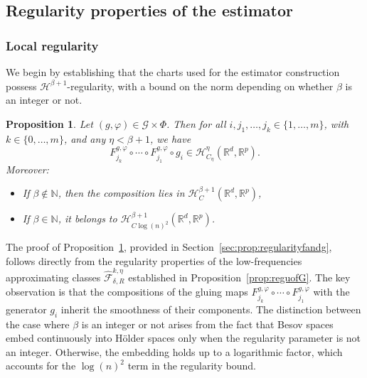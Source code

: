\documentclass[10pt]{article}
\newtheorem{proposition}{Proposition}
\begin{document}
\subsection{Regularity properties of the estimator}\label{sec:reguofes}
\subsubsection{Local regularity}
We begin by establishing that the charts used for the estimator construction possess \( \mathcal{H}^{\beta+1} \)-regularity, with a  bound on the norm depending on whether \( \beta \) is an integer or not.

\begin{proposition}\label{prop:regularityfandg}
Let \( (g, \varphi) \in \mathcal{G} \times \Phi \). Then for all \( i, j_1, \ldots, j_k \in \{1, \ldots, m\} \), with \( k \in \{0, \ldots, m\} \), and any \( \eta < \beta+1 \), we have
\[
F^{g,\varphi}_{j_k} \circ \cdots \circ F^{g,\varphi}_{j_1} \circ g_i \in \mathcal{H}^{\eta}_{C_\eta}(\mathbb{R}^d, \mathbb{R}^p).
\]
Moreover:
\begin{itemize}
    \item If \( \beta \notin \mathbb{N} \), then the composition lies in \( \mathcal{H}^{\beta+1}_C(\mathbb{R}^d, \mathbb{R}^p) \),
    \item If \( \beta \in \mathbb{N} \), it belongs to \( \mathcal{H}^{\beta+1}_{C\log(n)^2}(\mathbb{R}^d, \mathbb{R}^p) \).
\end{itemize}
\end{proposition}
The proof of Proposition~\ref{prop:regularityfandg}, provided in Section~\ref{sec:prop:regularityfandg}, follows directly from the regularity properties of the low-frequencies approximating classes \( \hat{\mathcal{F}}_{\delta,R}^{k,\eta} \) established in Proposition~\ref{prop:reguofG}. The key observation is that the compositions of the gluing maps \( F^{g,\varphi}_{j_k} \circ \cdots \circ F^{g,\varphi}_{j_1} \) with the generator \( g_i \) inherit the smoothness of their components. The distinction between the case where \( \beta \) is an integer or not arises from the fact that Besov spaces embed continuously into Hölder spaces only when the regularity parameter is not an integer. Otherwise, the embedding holds up to a logarithmic factor, which accounts for the \( \log(n)^2 \) term in the regularity bound.
  
\end{document}
